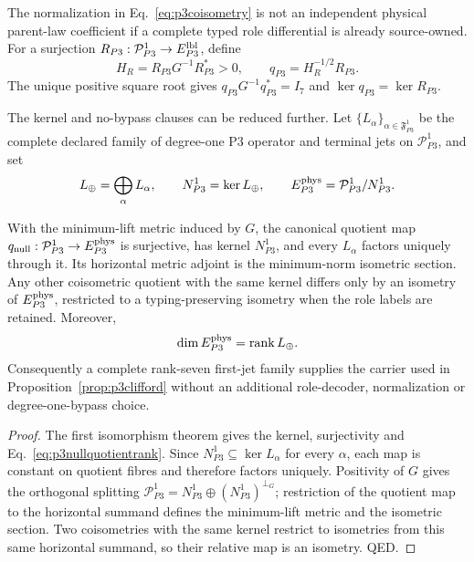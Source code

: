 The normalization in Eq.~\eqref{eq:p3coisometry} is not an independent
physical parent-law coefficient if a complete typed role differential is already
source-owned.  For a surjection
$R_{P3}:\mathcal P_{P3}^1\to E_{P3}^{\rm lbl}$, define
\begin{equation}
H_R=R_{P3}G^{-1}R_{P3}^{*}>0,
\qquad
q_{P3}=H_R^{-1/2}R_{P3}.
\label{eq:p3polarquotient}
\end{equation}
The unique positive square root gives
$q_{P3}G^{-1}q_{P3}^{*}=I_7$ and
$\ker q_{P3}=\ker R_{P3}$.

The kernel and no-bypass clauses can be reduced further.  Let
$\{L_\alpha\}_{\alpha\in\mathfrak F_{P3}^{1}}$ be the complete declared
family of degree-one P3 operator and terminal jets on
$\mathcal P_{P3}^{1}$, and set
\begin{equation}
L_\oplus=\bigoplus_\alpha L_\alpha,
\qquad
N_{P3}^{1}=\ker L_\oplus,
\qquad
E_{P3}^{\rm phys}=\mathcal P_{P3}^{1}/N_{P3}^{1}.
\label{eq:p3nullquotient}
\end{equation}

\begin{proposition}
\label{prop:p3nullquotient}
With the minimum-lift metric induced by $G$, the canonical quotient map
$q_{\rm null}:\mathcal P_{P3}^{1}\to E_{P3}^{\rm phys}$ is surjective,
has kernel $N_{P3}^{1}$, and every $L_\alpha$ factors uniquely through it.
Its horizontal metric adjoint is the minimum-norm isometric section.  Any
other coisometric quotient with the same kernel differs only by an isometry
of $E_{P3}^{\rm phys}$, restricted to a typing-preserving isometry when the
role labels are retained.  Moreover,
\begin{equation}
\dim E_{P3}^{\rm phys}=\operatorname{rank}L_\oplus.
\label{eq:p3nullquotientrank}
\end{equation}
Consequently a complete rank-seven first-jet family supplies the carrier used
in Proposition~\ref{prop:p3clifford} without an additional role-decoder,
normalization or degree-one-bypass choice.
\end{proposition}

\begin{proof}
The first isomorphism theorem gives the kernel, surjectivity and
Eq.~\eqref{eq:p3nullquotientrank}.  Since
$N_{P3}^{1}\subseteq\ker L_\alpha$ for every $\alpha$, each map is constant
on quotient fibres and therefore factors uniquely.  Positivity of $G$ gives
the orthogonal splitting
$\mathcal P_{P3}^{1}=N_{P3}^{1}\oplus(N_{P3}^{1})^{\perp_G}$; restriction of
the quotient map to the horizontal summand defines the minimum-lift metric and
the isometric section.  Two coisometries with the same kernel restrict to
isometries from this same horizontal summand, so their relative map is an
isometry.  QED.
\end{proof}

